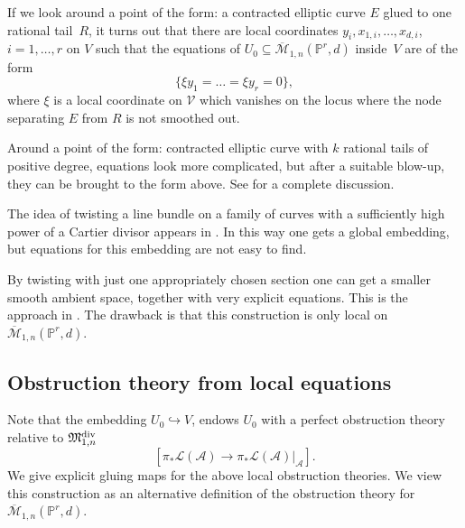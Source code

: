 \documentclass[pdftex]{sigma}
\numberwithin{equation}{section}
\newcommand{\MM}[4]{\overline{\mathcal M}_{#1,#2}(#3,#4)}
\theoremstyle{plain}
\theoremstyle{definition}
\theoremstyle{remark}
\begin{document}
If we look around a point of the form: a contracted elliptic curve $E$ glued to one rational tail~$R$, it turns out that there are local coordinates $y_i,x_{1,i},\ldots,x_{d,i}$, $i=1,\ldots,r$ on $V$ such that the equations of $U_0\subseteq \MM{1}{n}{\mathbb P^r}{d}$ inside~$V$ are of the form
\begin{equation}\label{genoneeq}
\{\xi y_1=\dots = \xi y_r=0\},
\end{equation}
where $\xi$ is a local coordinate on $\mathcal V$ which vanishes on the locus where the node separating $E$ from $R$ is not smoothed out.

Around a point of the form: contracted elliptic curve with $k$ rational tails of positive degree, equations look more complicated, but after a suitable blow-up, they can be brought to the form above. See \cite{HL} for a complete discussion.
\begin{Remark}The idea of twisting a line bundle on a family of curves with a sufficiently high power of a Cartier divisor appears in \cite{CF-K,CF-K-M}. In this way one gets a global embedding, but equations for this embedding are not easy to find.

By twisting with just one appropriately chosen section one can get a smaller smooth ambient space, together with very explicit equations. This is the approach in \cite[Theorem~4.16]{HL}. The drawback is that this construction is only local on $\MM{1}{n}{\mathbb P^r}{d}$.
\end{Remark}

\subsection{Obstruction theory from local equations} \label{obs:loceq}
Note that the embedding $U_0\hookrightarrow V$, endows $U_0$ with a perfect obstruction theory relative to $\mathfrak{M}^{\rm div}_{1,n}$
\[[\pi_*\mathcal L(\mathcal A)\to \pi_*\mathcal L(\mathcal A)|_{\mathcal A}].\]
We give explicit gluing maps for the above local obstruction theories. We view this construction as an alternative definition of the obstruction theory for $\MM{1}{n}{\mathbb P^r}{d}$.
\end{document}
